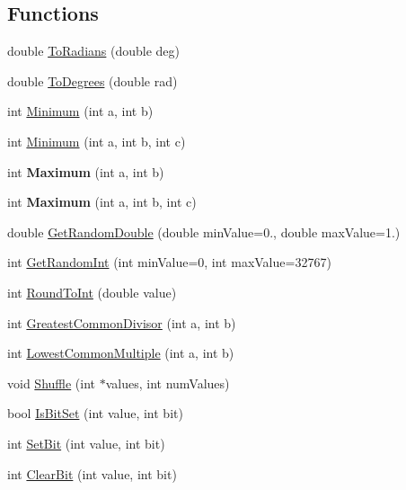 \subsection*{Functions}
\begin{DoxyCompactItemize}
\item 
double \hyperlink{group__math__group_gafdd4eddaf6eadf34406a865e0cf6a30a}{To\+Radians} (double deg)
\item 
double \hyperlink{group__math__group_gab6efcc6e24e777db0fe5e0d0955c2b2d}{To\+Degrees} (double rad)
\item 
int \hyperlink{group__math__group_ga3b74a8d5a155a56580ecd5617cacb4b1}{Minimum} (int a, int b)
\item 
int \hyperlink{group__math__group_gac4c560cadf6af2e052f767eb02d982c0}{Minimum} (int a, int b, int c)
\item 
\mbox{\label{group__math__group_ga9afd8a6d559a06465541ce2c6f99fc1d}} 
int {\bfseries Maximum} (int a, int b)
\item 
\mbox{\label{group__math__group_ga4c9a564a95fdd10c4ac6998afe8e3743}} 
int {\bfseries Maximum} (int a, int b, int c)
\item 
double \hyperlink{group__math__group_ga298f9ccec14d3ea06c05ccd1e1e062ac}{Get\+Random\+Double} (double min\+Value=0., double max\+Value=1.)
\item 
int \hyperlink{group__math__group_gab82c25b1da5feec79806fe080becf2c3}{Get\+Random\+Int} (int min\+Value=0, int max\+Value=32767)
\item 
int \hyperlink{group__math__group_ga06bd02ff0de83d2713683574ac288fb3}{Round\+To\+Int} (double value)
\item 
int \hyperlink{group__math__group_gaaf5732ddb11cda2a05f0f978265a114e}{Greatest\+Common\+Divisor} (int a, int b)
\item 
int \hyperlink{group__math__group_ga322fe1f4e7738ff3234fe70d04daeafe}{Lowest\+Common\+Multiple} (int a, int b)
\item 
void \hyperlink{group__math__group_ga9dffb844db4ac8823c6c957448576ed8}{Shuffle} (int $\ast$values, int num\+Values)
\item 
bool \hyperlink{group__math__group_ga1fbbb8c0c7c30db6995b5a4fa82e1754}{Is\+Bit\+Set} (int value, int bit)
\item 
int \hyperlink{group__math__group_ga8c8748fbb1d3e99db79f20fc17d4e63b}{Set\+Bit} (int value, int bit)
\item 
int \hyperlink{group__math__group_ga4ce9c5e2cee3bf609fcfba01c0f8e6a7}{Clear\+Bit} (int value, int bit)
\end{DoxyCompactItemize}


